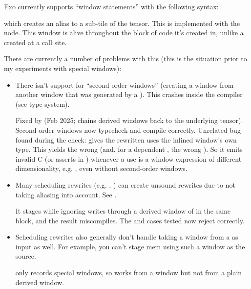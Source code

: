 \filbreak
{}

Exo currently supports ``window statements'' with the following syntax:


which creates an alias to a sub-tile of the tensor.
This is implemented with the  node.
This window is alive throughout the block of code it's created in, unlike a  created at a call site.

\filbreak
There are currently a number of problems with this (this is the situation prior to my experiments with special windows):

\begin{itemize}
  \item There isn't support for ``second order windows'' (creating a window from another window that was generated by a ).
    This crashes inside the compiler (see type system).

     Fixed by  (Feb 2025;  chains derived windows back to the underlying tensor).
    Second-order windows now typecheck and compile correctly.
    Unrelated bug found during the check:  gives the rewritten  uses the inlined window's own  type.
    This yields the wrong  (and, for a dependent , the wrong ).
    So it emits invalid C (or asserts in ) whenever a use is a window expression of different dimensionality, e.g. , even without second-order windows.
  \item Many scheduling rewrites (e.g. , ) can create unsound rewrites due to not taking aliasing into account.
    See .

     It stages  while ignoring writes through a derived window of  in the same block, and the result miscompiles.
    The  and  cases tested now reject correctly.
  \item Scheduling rewrites also generally don't handle taking a window from a  as input as well.
    For example, you can't stage mem using such a window as the source.

      only records special windows, so  works from a  window but not from a plain derived window.
\end{itemize}

